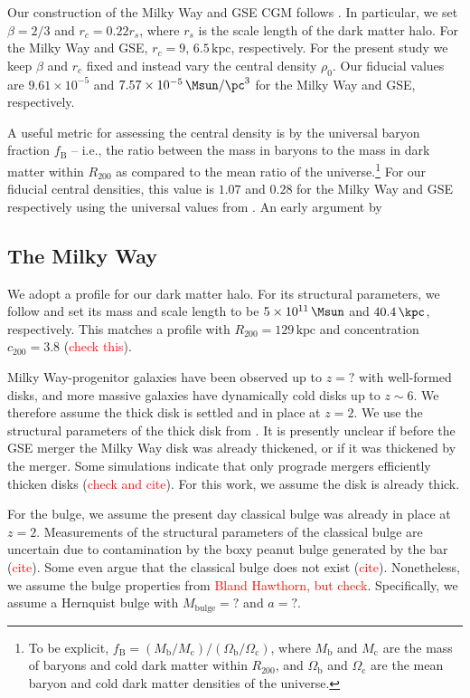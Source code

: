 Our construction of the Milky Way and GSE CGM follows
\citet{2023MNRAS.tmp.2070B}. In particular, we set $\beta=2/3$ and $r_c=0.22
r_s$, where $r_s$ is the scale length of the dark matter halo. For the Milky Way
and GSE, $r_c=9$, $6.5\,\textrm{kpc}$, respectively. For the present study we
keep $\beta$ and $r_c$ fixed and instead vary the central density $\rho_0$. Our
fiducial values are $9.61\times10^{-5}$ and $7.57\times10^{-5}\,\Msun/\pc^3$ for
the Milky Way and GSE, respectively.

A useful metric for assessing the central density is by the universal baryon
fraction $f_{\textrm{B}}$ -- i.e., the ratio between the mass in baryons to the
mass in dark matter within $R_{200}$ as compared to the mean ratio of the
universe.\footnote{To be explicit,
$f_{\textrm{B}}=(M_{\textrm{b}}/M_{\textrm{c}})/(\Omega_{\textrm{b}}/\Omega_{\textrm{c}})$,
where $M_{\textrm{b}}$ and $M_{\textrm{c}}$ are the mass of baryons and cold
dark matter within $R_{200}$, and $\Omega_{\textrm{b}}$ and
$\Omega_{\textrm{c}}$ are the mean baryon and cold dark matter densities of the
universe.} For our fiducial central densities, this value is $1.07$ and $0.28$
for the Milky Way and GSE respectively using the universal values from
\cite{2014AA...571A..16P}. An early argument by 

\subsection{The Milky Way}
We adopt a \citet{1990ApJ...356..359H} profile for our dark matter halo. For its
structural parameters, we follow \citet{2021ApJ...923...92N} and set its mass
and scale length to be $5\times10^{11}\,\Msun$ and $40.4\,\kpc$, respectively.
This matches a \citet{1996ApJ...462..563N} profile with
$R_{200}=129\,\textrm{kpc}$ and concentration $c_{200}=3.8$
(\textcolor{red}{check this}).

Milky Way-progenitor galaxies have been observed up to $z=?$ with well-formed
disks, and more massive galaxies have dynamically cold disks up to $z\sim6$. We
therefore assume the thick disk is settled and in place at $z=2$. We use the
structural parameters of the thick disk from . It is presently unclear if before
the GSE merger the Milky Way disk was already thickened, or if it was thickened
by the merger. Some simulations indicate that only prograde mergers efficiently
thicken disks (\textcolor{red}{check and cite}). For this work, we assume the
disk is already thick.

For the bulge, we assume the present day classical bulge was already in place at
$z=2$. Measurements of the structural parameters of the classical bulge are
uncertain due to contamination by the boxy peanut bulge generated by the bar
(\textcolor{red}{cite}). Some even argue that the classical bulge does not exist
(\textcolor{red}{cite}). Nonetheless, we assume the bulge properties from
\textcolor{red}{Bland Hawthorn, but check}. Specifically, we assume a Hernquist
bulge with $M_{\textrm{bulge}}=?$ and $a=?$.

